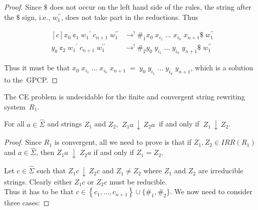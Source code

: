 \documentclass{lmcs} %
\theoremstyle{plain}\newtheorem{satz}[thm]{Satz} %
\newcommand{\ignore}[1]{}
\begin{document}
\begin{appendices}
\begin{proof}
Since $\$$ does not occur on the left hand side of the rules, the string after the $\$$ sign, i.e., ${w_1^{\prime\prime}}$,
does not take part in the reductions. Thus

\begin{equation*}
\begin{aligned}[c]
x_0\;\cent_1\; {w_1}^{\prime}\;c_{n+1}\; {w_1^{\prime\prime}} & \rightarrow_{}^! \#_1 x_{0}\;x_{i_1}\; \ldots \;x_{i_k}\;x_{n+1} \$\; {w_1^{\prime\prime}}\\
y_0\;\cent_2\; {w_1}^{\prime}\;c_{n+1}\; {w_1^{\prime\prime}} & \rightarrow_{}^! \#_2 y_{0}\;y_{i_1}\; \ldots \;y_{i_k}\;y_{n+1} \$\; {w_1^{\prime\prime}}
\end{aligned}
\end{equation*}

\ignore{$\ldots$ \todo{Finish this.}
$w_2$ is in the form of domino strings, thus, there exists a solution for GPCP if and only if $w_1$ and $w_2$ exist such that $x_0 \cent_1\; w_1 \rightarrow^{!} \#_1 w_2$ and $y_0 \cent_2\; w_1
  \rightarrow^{!} \#_2 w_2$.
}

Thus it must be that $x_{0}\;x_{i_1}\; \ldots \;x_{i_k}\;x_{n+1} \; = \; y_{0}\;y_{i_1}\; \ldots \;y_{i_k}\;y_{n+1}$,
which is a solution to the~GPCP.
\end{proof}

\begin{thm}
The CE problem is undecidable for the finite and convergent string rewriting system~$R_1^{}$.
\end{thm}

\begin{lem}
For all $a \in \widehat{\Sigma}$ and strings $Z_1$ and $Z_2$,
$~ Z_1 a \, \downarrow \, Z_2 a ~$ if and only if $~ Z_1 \, \downarrow \, Z_2$.
\end{lem}

\begin{proof}
  Since $R_1^{}$ is convergent, all we need to prove is that
  if $Z_1, Z_2 \in IRR(R_1^{})$ and $a \in \widehat{\Sigma}$, then
  $Z_1 a \; \downarrow \; Z_2 a$ if and only if $Z_1 = Z_2$.

  Let $c \in \widehat{\Sigma}$ such that $Z_1 c \, \downarrow \, Z_2 c$
  and $Z_1 \neq Z_2$ where $Z_1$ and $Z_2$ are irreducible strings.
  Clearly either $Z_1 c$ or $Z_2 c$ must be reducible.
  \\Thus it has to be that
  $c \in \left\{ c_1, \ldots , c_{n+1} \right\} \cup \{ \#_1 , \#_2 \}$.
  We now need to consider three cases:


\end{proof}
\end{appendices}
\end{document}
